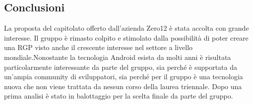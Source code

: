 \subsection{Conclusioni}
La proposta del capitolato offerto dall'azienda Zero12 è stata accolta con grande interesse. Il gruppo è rimasto colpito e stimolato dalla possibilità 
di poter creare una RGP visto anche il crescente interesse nel settore a livello mondiale.Nonostante la tecnologia Android esista da molti anni è risultata particolarmente 
interessante da parte del gruppo, sia perché è supportata da un'ampia community di sviluppatori, sia perché per il gruppo è una tecnologia nuova che non viene 
trattata da nessun corso della laurea triennale. Dopo una prima analisi è stato in balottaggio per la scelta finale da parte del gruppo.
